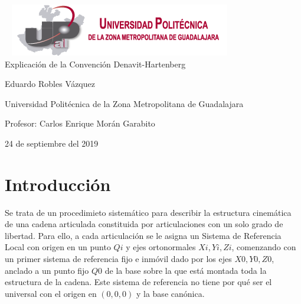 \documentclass[11pt,a4paper,oldfontcommands,oneside]{memoir}
\begin{document}
%
%
\thispagestyle{empty}

{%
\sffamily
\centering
\Large

~\vspace{\fill}
\includegraphics[scale=1]{logo.png} \\
{\huge 
\vspace{4cm}
Explicación de la Convención Denavit-Hartenberg
}
\vspace{2.5cm}

{\LARGE
Eduardo Robles Vázquez
}

\vspace{2.5cm}

Universidad Politécnica de la Zona Metropolitana de Guadalajara

\vspace{3.5cm}

Profesor: Carlos Enrique Morán Garabito

\vspace{\fill}

24 de septiembre del 2019

}%

\vspace{.5cm}
\hfill\break




\tableofcontents*

\clearpage


\chapter{Introducción}
Se trata de un procedimieto sistemático para describir la estructura cinemática de una cadena articulada constituida por articulaciones con un solo grado de libertad.
Para ello, a cada articulación se le asigna un Sistema de Referencia Local con origen en un punto $Qi$ y ejes ortonormales ${Xi,Yi,Zi}$, comenzando con un primer sistema de referencia fijo e inmóvil dado por los ejes ${X0,Y0,Z0}$, anclado a un punto fijo $Q0$ de la base sobre la que está montada toda la estructura de la cadena.
Este sistema de referencia no tiene por qué ser el universal con el origen en $(0,0,0)$ y la base canónica.
\vspace{2cm}
\hfill
\end{document}
